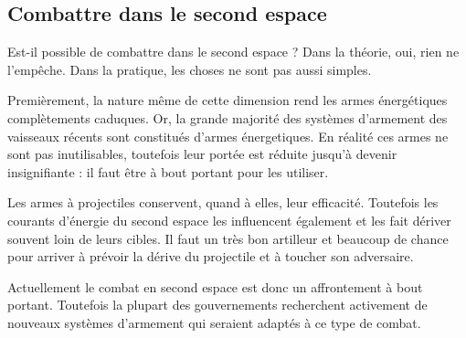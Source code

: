 
\begin{multicols}{2}

\subsection{Combattre dans le second espace}

Est-il possible de combattre dans le second espace ? Dans la théorie, oui, rien ne l'empêche. Dans la pratique, les choses ne sont pas aussi simples.

Premièrement, la nature même de cette dimension rend les armes énergétiques complètements caduques. Or, la grande majorité des systèmes d'armement des vaisseaux récents sont constitués d'armes énergetiques. En réalité ces armes ne sont pas inutilisables, toutefois leur portée est réduite jusqu'à devenir insignifiante : il faut être à bout portant pour les utiliser.

Les armes à projectiles conservent, quand à elles, leur efficacité. Toutefois les courants d'énergie du second espace les influencent également et les fait dériver souvent loin de leurs cibles. Il faut un très bon artilleur et beaucoup de chance pour arriver à prévoir la dérive du projectile et à toucher son adversaire. 

Actuellement le combat en second espace est donc un affrontement à bout portant. Toutefois la plupart des gouvernements recherchent activement de nouveaux systèmes d'armement qui seraient adaptés à ce type de combat.

\end{multicols}
